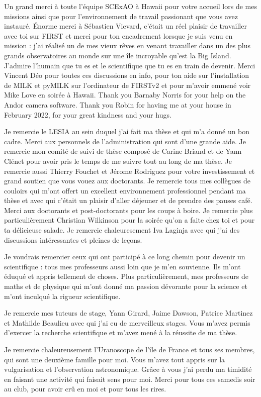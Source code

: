 Un grand merci à toute l'équipe SCExAO à Hawaii pour votre accueil lors de mes missions ainsi que pour l'environnement de travail passionant que vous avez instauré. Énorme merci à Sébastien Vievard, c'était un réel plaisir de travailler avec toi sur FIRST et merci pour ton encadrement lorsque je suis venu en mission : j'ai réalisé un de mes vieux rêves en venant travailler dans un des plus grands observatoires au monde sur une île incroyable qu'est la Big Island. J'admire l'humain que tu es et le scientifique que tu es en train de devenir. Merci Vincent Déo pour toutes ces discussions en info, pour ton aide sur l'installation de MILK et pyMILK sur l'ordinateur de FIRSTv2 et pour m'avoir emmené voir Mike Love en soirée à Hawaii. Thank you Barnaby Norris for your help on the Andor camera software. Thank you Robin for having me at your house in February 2022, for your great kindness and your hugs.

Je remercie le LESIA au sein duquel j'ai fait ma thèse et qui m'a donné un bon cadre. Merci aux personnels de l'administration qui sont d'une grande aide. Je remercie mon comité de suivi de thèse composé de Carine Briand et de Yann Clénet pour avoir pris le temps de me suivre tout au long de ma thèse. Je remercie aussi Thierry Fouchet et Jérome Rodriguez pour votre investissement et grand soutien que vous vouez aux doctorants. Je remercie tous mes collègues de couloirs qui m'ont offert un excellent environnement professionnel pendant ma thèse et avec qui c'était un plaisir d'aller déjeuner et de prendre des pauses café. Merci aux doctorants et post-doctorants pour les coups à boire. Je remercie plus particulièrement Christian Wilkinson pour la soirée qu'on a faite chez toi et pour ta délicieuse salade. Je remercie chaleuresement Iva Laginja avec qui j'ai des discussions intéressantes et pleines de leçons.

Je voudrais remercier ceux qui ont participé à ce long chemin pour devenir un scientifique : tous mes professeurs aussi loin que je m'en souvienne. Ils m'ont éduqué et appris tellement de choses. Plus particulièrement, mes professeurs de maths et de physique qui m'ont donné ma passion dévorante pour la science et m'ont inculqué la rigueur scientifique.

Je remercie mes tuteurs de stage, Yann Girard, Jaime Dawson, Patrice Martinez et Mathilde Beaulieu avec qui j'ai eu de merveilleux stages. Vous m'avez permis d'exercer la recherche scientifique et m'avez mené à la réussite de ma thèse.

Je remercie chaleureusement l'Uranoscope de l'île de France et tous ses membres, qui sont une deuxième famille pour moi. Vous m'avez tout appris sur la vulgarisation et l'observation astronomique. Grâce à vous j'ai perdu ma timidité en faisant une activité qui faisait sens pour moi. Merci pour tous ces samedis soir au club, pour avoir crû en moi et pour tous les rires.

